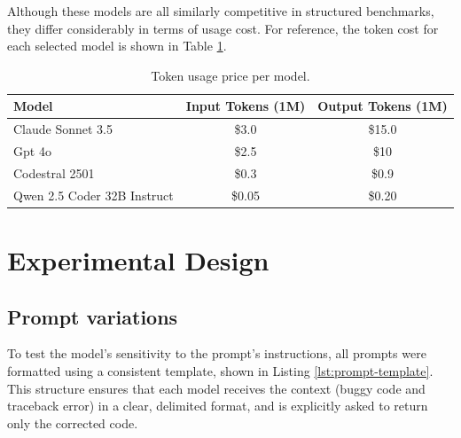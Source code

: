 


Although these models are all similarly competitive in structured benchmarks, they differ considerably in terms of usage cost. For reference, the token cost for each selected model is shown in Table \ref{tab:model-tokens}.
\begin{table}[h!]
\centering
\caption{Token usage price per model.}
\label{tab:model-tokens}
\begin{tabular}{|l|c|c|}
\hline
\textbf{Model} & \textbf{Input Tokens (1M)} & \textbf{Output Tokens (1M)} \\ \hline
Claude Sonnet 3.5 & \$3.0 & \$15.0 \\ \hline
Gpt 4o & \$2.5 & \$10 \\ \hline
Codestral 2501 & \$0.3 & \$0.9 \\ \hline
Qwen 2.5 Coder 32B Instruct & \$0.05 & \$0.20 \\ \hline
\end{tabular}
\end{table}


\section{Experimental Design}
\subsection{Prompt variations}

To test the model's sensitivity to the prompt's instructions, all prompts were formatted 
using a consistent template, shown in Listing \ref{lst:prompt-template}. This structure ensures 
that each model receives the context (buggy code and traceback error) in a clear, delimited 
format, and is explicitly asked to return only the corrected code.

